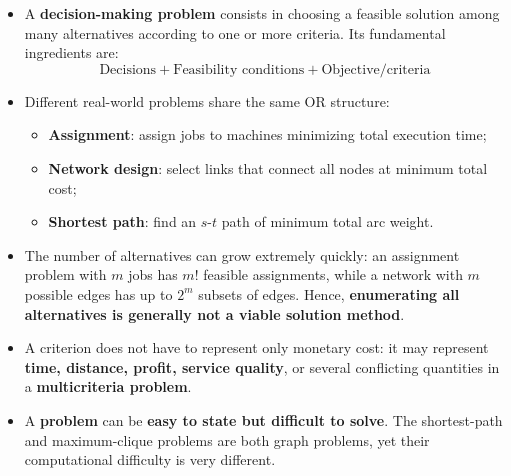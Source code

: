 \highspace
\begin{takeawaysbox}
    \begin{itemize}
        \item A \textbf{decision-making problem} consists in choosing a feasible solution among many alternatives according to one or more criteria. Its fundamental ingredients are:
            \begin{equation*}
                \boxed{\text{Decisions} + \text{Feasibility conditions} + \text{Objective/criteria}}
            \end{equation*}

        \item Different real-world problems share the same OR structure:
            \begin{itemize}
                \item \textbf{Assignment}: assign jobs to machines minimizing total execution time;
                \item \textbf{Network design}: select links that connect all nodes at minimum total cost;
                \item \textbf{Shortest path}: find an $s$-$t$ path of minimum total arc weight.
            \end{itemize}

        \item The number of alternatives can grow extremely quickly: an assignment problem with $m$ jobs has $m!$ feasible assignments, while a network with $m$ possible edges has up to $2^m$ subsets of edges. Hence, \textbf{enumerating all alternatives is generally not a viable solution method}.

        \item A criterion does not have to represent only monetary cost: it may represent \textbf{time, distance, profit, service quality}, or several conflicting quantities in a \textbf{multicriteria problem}.

        \item A \textbf{problem} can be \textbf{easy to state but difficult to solve}. The shortest-path and maximum-clique problems are both graph problems, yet their computational difficulty is very different.
    \end{itemize}
\end{takeawaysbox}